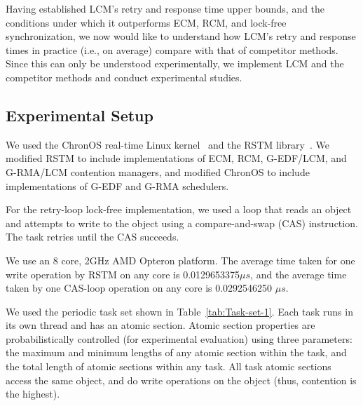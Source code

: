 \documentclass[letter]{sig-alternate}
\begin{document}
Having established LCM's retry and response time upper bounds, and the conditions under which it outperforms ECM, RCM, and lock-free synchronization, we now would like to understand how LCM's retry and response times in practice (i.e., on average) compare with that of competitor methods. Since this can only be understood experimentally, we implement LCM and the competitor methods and conduct experimental studies. 

\subsection{Experimental Setup}
We used the ChronOS real-time Linux kernel~\cite{dellinger2011chronos}
and the RSTM library~\cite{marathe2006lowering}. We modified RSTM to include implementations of ECM, RCM, G-EDF/LCM, and G-RMA/LCM contention managers, and modified ChronOS to include implementations of G-EDF and G-RMA schedulers. 

For the retry-loop lock-free implementation,
we used a loop that reads an object and attempts to write to the object using a compare-and-swap (CAS) instruction. The task retries until the CAS succeeds. 

We use an 8 core, 2GHz AMD Opteron platform. The average time
taken for one write operation by RSTM on any
core is 0.0129653375$\mu s$, and the average time taken
by one CAS-loop operation on any core is 0.0292546250 $\mu s$.

We used the periodic task set shown in Table~\ref{tab:Task-set-1}. Each task runs in its own thread and has an atomic section. Atomic section properties are probabilistically controlled (for experimental evaluation) using three parameters: the maximum and minimum lengths of any atomic section within the task, and the total length of atomic sections within any task. All task atomic sections access the same object, and do write operations on the object (thus, contention is the highest).
\end{document}
